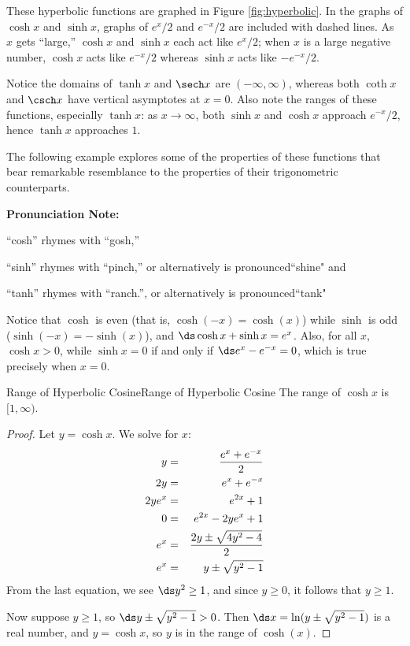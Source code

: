 These hyperbolic functions are graphed in Figure \ref{fig:hyperbolic}. In the graphs of $\cosh x$ and $\sinh x$, graphs of $e^x/2$ and $e^{-x}/2$ are included with dashed lines. As $x$ gets ``large,'' $\cosh x$ and $\sinh x$ each act like $e^x/2$; when $x$ is a large negative number, $\cosh x$ acts like $e^{-x}/2$ whereas $\sinh x$ acts like $-e^{-x}/2$.

Notice the domains of $\tanh x$ and $\sech x$ are $(-\infty,\infty)$, whereas both $\coth x$ and $\csch x$ have vertical asymptotes at $x=0$. Also note the ranges of these functions, especially $\tanh x$: as $x\to\infty$, both $\sinh x$ and $\cosh x$ approach $e^{-x}/2$, hence $\tanh x$ approaches $1$.

The following example explores some of the properties of these functions that bear remarkable resemblance to the properties of their trigonometric counterparts.\\

{\textbf{Pronunciation Note:} \par 
``cosh'' rhymes with ``gosh,'' \par ``sinh'' rhymes with ``pinch,'' or alternatively is pronounced``shine" and \par ``tanh'' rhymes with ``ranch.'', or alternatively is pronounced``tank"}

Notice that $\cosh$ is even (that is, $\cosh(-x)=\cosh(x)$)
while $\sinh$ is odd ($\sinh(-x)=-\sinh(x)$), and
$\ds\cosh x + \sinh x = e^x$. Also, for all $x$,
$\cosh x >0$, while $\sinh x=0$ if and only if $\ds e^x -e^{-x }=0$,
which is true precisely when $x=0$.

\begin{theorem}{Range of Hyperbolic Cosine}{Range of Hyperbolic Cosine}
The range of $\cosh x$ is $[1,\infty)$.
\end{theorem}

\begin{proof}
Let $y= \cosh x$. We solve for $x$:
\begin{eqnarray*}
y&=&{e^x +e^{-x }\over 2}\cr
2y &=& e^x + e^{-x }\cr
2ye^x &=& e^{2x} + 1\cr
 0 &=& e^{2x}-2ye^x +1\cr
 e^{x} &=& {2y \pm \sqrt{4y^2 -4}\over 2}\cr
 e^{x} &=& y\pm \sqrt{y^2 -1}
\end{eqnarray*}
From the last equation, we see $\ds y^2 \geq 1$, and since
$y\geq 0$, it follows that $y\geq 1$.

Now suppose $y\geq 1$, so $\ds y\pm \sqrt{y^2 -1}>0$. Then
$\ds x = \ln(y\pm \sqrt{y^2 -1})$ is a real number, and 
$y =\cosh x$, so $y$ is in the range of $\cosh(x)$.
\end{proof}

